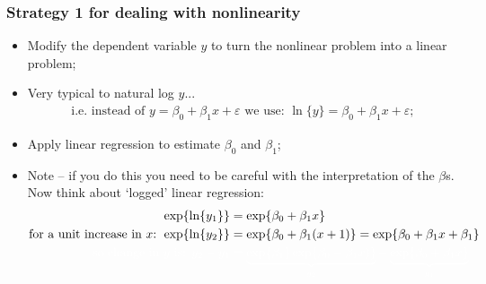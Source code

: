 \documentclass[aspectratio=169]{beamer}
\theoremstyle{principle}
\begin{document}
\begin{frame}
\frametitle{Strategy 1 for dealing with nonlinearity}

\begin{itemize}
\item Modify the dependent variable $y$ to turn the nonlinear problem into a linear problem;
\item Very typical to natural log $y$...
\begin{align*}
\mbox{i.e. instead of }y = \beta_0 + \beta_1x + \varepsilon\mbox{ we use: }\ln\{y\} = \beta_0 + \beta_1x + \varepsilon;
\end{align*}
\item Apply linear regression to estimate $\beta_0$ and $\beta_1$;
\item Note -- if you do this you need to be careful with the interpretation of the $\beta$s.  Now think about `logged' linear regression:
\begin{align*}
\exp\{\ln\{y_1\}\} &= \exp\{\beta_0 + \beta_1x\}\\
\mbox{for a unit increase in $x$: } \exp\{\ln\{y_2\}\} &= \exp\{\beta_0 + \beta_1(x + 1)\} = \exp\{\beta_0 + \beta_1x + \beta_1\}\\
\color{white}\mbox{so change in $y$ is: }y_2 - y_1 &\color{white}= \underbrace{\exp\{\beta_1\}\exp\{\beta_0 + \beta_1x)\}}_{y_2} - \underbrace{\exp\{\beta_0 + \beta_1x\}}_{y_1}
\end{align*}

\end{itemize}

\end{frame}
\end{document}
